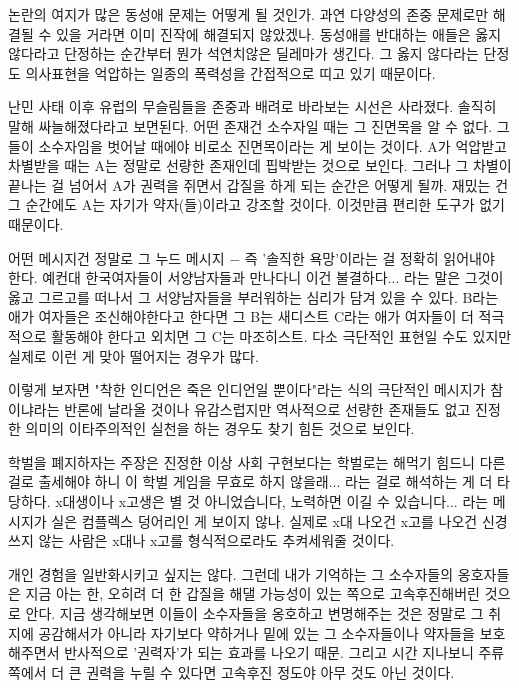 논란의 여지가 많은 동성애 문제는 어떻게 될 것인가.
과연 다양성의 존중 문제로만 해결될 수 있을 거라면 이미 진작에 해결되지 않았겠나.
동성애를 반대하는 애들은 옳지 않다라고 단정하는 순간부터 뭔가 석연치않은 딜레마가 생긴다.
그 옳지 않다라는 단정도 의사표현을 억압하는 일종의 폭력성을 간접적으로 띠고 있기 때문이다.
\vspace{5mm}

난민 사태 이후 유럽의 무슬림들을 존중과 배려로 바라보는 시선은 사라졌다. 솔직히 말해 싸늘해졌다라고 보면된다.
어떤 존재건 소수자일 때는 그 진면목을 알 수 없다. 그들이 소수자임을 벗어날 때에야 비로소 진면목이라는 게 보이는 것이다.
A가 억압받고 차별받을 때는 A는 정말로 선량한 존재인데 핍박받는 것으로 보인다.
그러나 그 차별이 끝나는 걸 넘어서 A가 권력을 쥐면서 갑질을 하게 되는 순간은 어떻게 될까.
재밌는 건 그 순간에도 A는 자기가 약자(들)이라고 강조할 것이다. 이것만큼 편리한 도구가 없기 때문이다.
\vspace{5mm}

어떤 메시지건 정말로 그 누드 메시지 $-$ 즉 '솔직한 욕망'이라는 걸 정확히 읽어내야 한다.
예컨대 한국여자들이 서양남자들과 만나다니 이건 불결하다... 라는 말은 그것이 옳고 그르고를 떠나서
그 서양남자들을 부러워하는 심리가 담겨 있을 수 있다.
B라는 애가 여자들은 조신해야한다고 한다면 그 B는 새디스트
C라는 애가 여자들이 더 적극적으로 활동해야 한다고 외치면 그 C는 마조히스트.
다소 극단적인 표현일 수도 있지만 실제로 이런 게 맞아 떨어지는 경우가 많다.
\vspace{5mm}

이렇게 보자면 "착한 인디언은 죽은 인디언일 뿐이다"라는 식의 극단적인 메시지가 참이냐라는 반론에 날라올 것이나
유감스럽지만 역사적으로 선량한 존재들도 없고 진정한 의미의 이타주의적인 실천을 하는 경우도 찾기 힘든 것으로 보인다.
\vspace{5mm}

학벌을 폐지하자는 주장은 진정한 이상 사회 구현보다는
학벌로는 해먹기 힘드니 다른 걸로 출세해야 하니 이 학벌 게임을 무효로 하지 않을래... 라는 걸로 해석하는 게 더 타당하다.
x대생이나 x고생은 별 것 아니었습니다, 노력하면 이길 수 있습니다... 라는 메시지가 실은 컴플렉스 덩어리인 게 보이지 않나.
실제로 x대 나오건 x고를 나오건 신경쓰지 않는 사람은 x대나 x고를 형식적으로라도 추켜세워줄 것이다.
\vspace{5mm}

개인 경험을 일반화시키고 싶지는 않다.
그런데 내가 기억하는 그 소수자들의 옹호자들은 지금 아는 한, 오히려 더 한 갑질을 해댈 가능성이 있는 쪽으로 고속후진해버린 것으로 안다.
지금 생각해보면 이들이 소수자들을 옹호하고 변명해주는 것은 정말로 그 취지에 공감해서가 아니라
자기보다 약하거나 밑에 있는 그 소수자들이나 약자들을 보호해주면서 반사적으로 '권력자'가 되는 효과를 나오기 때문.
그리고 시간 지나보니 주류 쪽에서 더 큰 권력을 누릴 수 있다면 고속후진 정도야 아무 것도 아닌 것이다.
\vspace{5mm}






